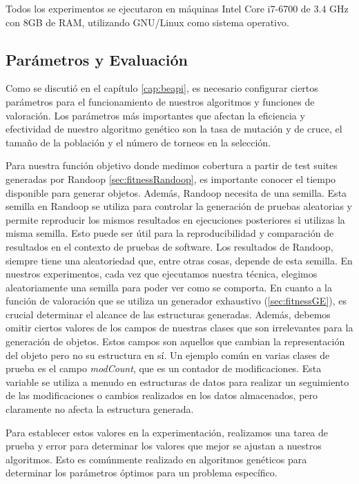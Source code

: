 Todos los experimentos se ejecutaron en máquinas Intel Core i7-6700 de 3.4 GHz con 8GB de RAM, utilizando GNU/Linux como sistema operativo. 



\subsection{Parámetros y Evaluación}
Como se discutió en el capítulo \ref{cap:beapi}, es necesario configurar ciertos parámetros para el funcionamiento de nuestros algoritmos y funciones de valoración. Los parámetros más importantes que afectan la eficiencia y efectividad de nuestro algoritmo genético son la tasa de mutación y de cruce, el tamaño de la población y el número de torneos en la selección. 

Para nuestra función objetivo donde medimos cobertura a partir de test suites generadas por Randoop \ref{sec:fitnessRandoop}, es importante conocer el tiempo disponible para generar objetos. Además, Randoop  necesita de una semilla. Esta semilla en Randoop se utiliza para controlar la generación de pruebas aleatorias y permite reproducir los mismos resultados en ejecuciones posteriores si utilizas la misma semilla. Esto puede ser útil para la reproducibilidad y comparación de resultados en el contexto de pruebas de software. Los resultados de Randoop, siempre tiene una aleatoriedad que, entre otras cosas, depende de esta semilla. En nuestros experimentos, cada vez que ejecutamos nuestra técnica, elegimos aleatoriamente una semilla para poder ver como se comporta. 
En cuanto a la función de valoración que se utiliza un generador exhaustivo (\ref{sec:fitnessGE}), es crucial determinar el alcance de las estructuras generadas. Además, debemos omitir ciertos valores de los campos de nuestras clases que son irrelevantes para la generación de objetos. Estos campos son aquellos que cambian la representación del objeto pero no su estructura en sí. Un ejemplo común en varias clases de prueba es el campo \emph{modCount}, que es un contador de modificaciones. Esta variable se utiliza a menudo en estructuras de datos para realizar un seguimiento de las modificaciones o cambios realizados en los datos almacenados, pero claramente no afecta la estructura generada.

Para establecer estos valores en la experimentación, realizamos una tarea de prueba y error para determinar los valores que mejor se ajustan a nuestros algoritmos. Esto es comúnmente realizado en algoritmos genéticos para determinar los parámetros óptimos para un problema específico.

